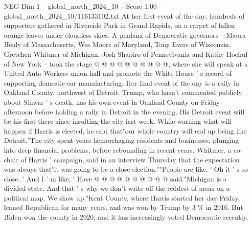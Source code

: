 \begin{textsample}{NEG Dim 1 – global\_north\_2024\_10 – Score 1.00 – global\_north\_2024\_10/116133102.txt}
At her first event of the day, hundreds of supporters gathered in Riverside Park in Grand Rapids, on a carpet of fallen orange leaves under cloudless skies.
A phalanx of Democratic governors -- Maura Healy of Massachusetts, Wes Moore of Maryland, Tony Evers of Wisconsin, Gretchen Whitmer of Michigan, Josh Shapiro of Pennsylvania and Kathy Hochul of New York -- took the stage @ @ @ @ @ @ @ @ @ @, where she will speak at a United Auto Workers union hall and promote the White House ' s record of supporting domestic car manufacturing.
Her final event of the day is a rally in Oakland County, northwest of Detroit.
Trump, who hasn't commented publicly about Sinwar ' s death, has his own event in Oakland County on Friday afternoon before holding a rally in Detroit in the evening.
His Detroit event will be his first there since insulting the city last week.
While warning what will happen if Harris is elected, he said that"our whole country will end up being like Detroit."The city spent years hemorrhaging residents and businesses, plunging into deep financial problems, before rebounding in recent years.
Whitmer, a co-chair of Harris ' campaign, said in an interview Thursday that the expectation was always that"it was going to be a close election.""People are like, ' Oh it ' s so close. ' And I ' m like, ' Have @ @ @ @ @ @ @ @ @ @ said."Michigan is a divided state.
And that ' s why we don't write off the reddest of areas on a political map.
We show up."Kent County, where Harris started her day Friday, leaned Republican for many years, and was won by Trump by 3 \% in 2016.
But Biden won the county in 2020, and it has increasingly voted Democratic recently.

\end{textsample}
